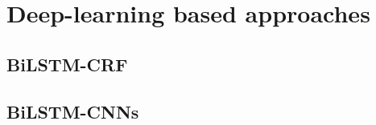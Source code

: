 \documentclass[a4paper,UTF8,no-math]{ctexart}
\begin{document}
	
	
	
	
	
	
	
	\section{Deep-learning based approaches}
	
	\subsection{BiLSTM-CRF}
	\subsection{BiLSTM-CNNs}

    
\end{document}
